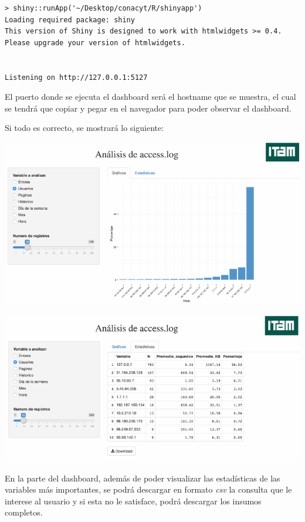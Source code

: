 \documentclass[]{article}
\begin{document}
\begin{verbatim}
> shiny::runApp('~/Desktop/conacyt/R/shinyapp')
Loading required package: shiny
This version of Shiny is designed to work with htmlwidgets >= 0.4. 
Please upgrade your version of htmlwidgets.


Listening on http://127.0.0.1:5127
\end{verbatim}

El puerto donde se ejecuta el dashboard será el hostname que se muestra,
el cual se tendrá que copiar y pegar en el navegador para poder observar
el dashboard.

Si todo es correcto, se mostrará lo siguiente:

\begin{center}\includegraphics{entregable-analisis_clickstream_files/figure-latex/unnamed-chunk-4-1} \end{center}

\begin{center}\includegraphics{entregable-analisis_clickstream_files/figure-latex/unnamed-chunk-5-1} \end{center}

En la parte del dashboard, además de poder visualizar las estadísticas
de las variables más importantes, se podrá descargar en formato
\emph{csv} la consulta que le interese al usuario y si esta no le
satisface, podrá descargar los insumos completos.
\end{document}

